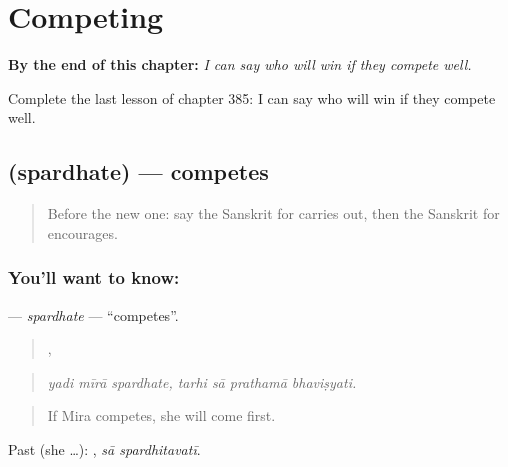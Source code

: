
\chapter{Competing}
\label{ch:sa-competing}

\begin{chapteropening}
\textbf{By the end of this chapter:} \emph{I can say who will win if they compete well.}

Complete the last lesson of chapter 385: I can say who will win if they compete well.
\end{chapteropening}

\section[\texorpdfstring{\sk{स्पर्धते} (spardhate)}{स्पर्धते (spardhate)}]{ (spardhate) — competes}

\label{lesson:SA-C385-spardhate}



\begin{quote}
Before the new one: say the Sanskrit for carries out, then the Sanskrit for encourages.
\end{quote}

\subsection*{You'll want to know: }
\textbf{} — \emph{spardhate} — \textquotedblleft{}competes\textquotedblright{}.

\begin{quote}
  ,    
\end{quote}

\begin{quote}
\emph{yadi mīrā spardhate, tarhi sā prathamā bhaviṣyati.}
\end{quote}

\begin{quote}
If Mira competes, she will come first.
\end{quote}

Past (she …):  , \emph{sā spardhitavatī}.

